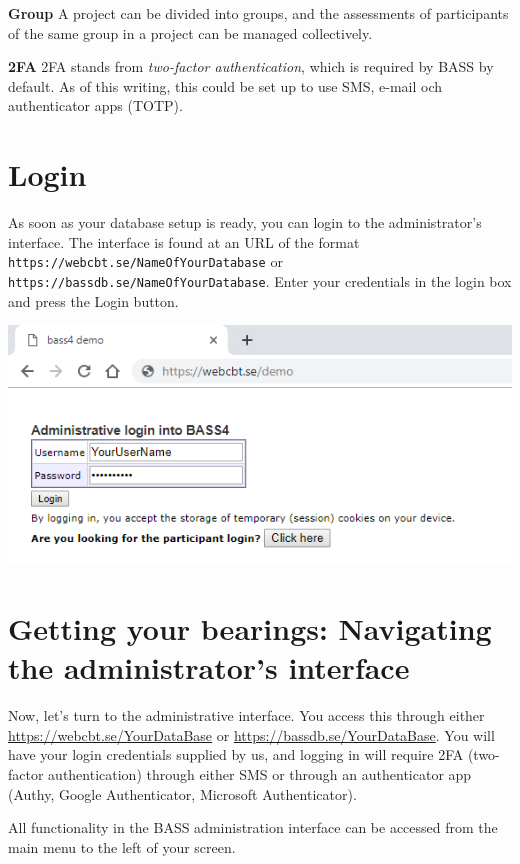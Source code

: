 \documentclass[
]{book}
\begin{document}
\textbf{Group}
A project can be divided into groups, and the assessments of participants of the same group in a project can be managed collectively.

\textbf{2FA}
2FA stands from \emph{two-factor authentication}, which is required by BASS by default. As of this writing, this could be set up to use SMS, e-mail och authenticator apps (TOTP).

\chapter{Login}\label{login}

As soon as your database setup is ready, you can login to the administrator's interface. The interface is found at an URL of the format \texttt{https://webcbt.se/NameOfYourDatabase} or \texttt{https://bassdb.se/NameOfYourDatabase}. Enter your credentials in the login box and press the Login button.

\includegraphics{images/login.png}

\chapter{Getting your bearings: Navigating the administrator's interface}\label{getting-your-bearings-navigating-the-administrators-interface}

Now, let's turn to the administrative interface. You access this through either \url{https://webcbt.se/YourDataBase} or \url{https://bassdb.se/YourDataBase}. You will have your login credentials supplied by us, and logging in will require 2FA (two-factor authentication) through either SMS or through an authenticator app (Authy, Google Authenticator, Microsoft Authenticator).

All functionality in the BASS administration interface can be accessed from the main menu to the left of your screen.
\end{document}
